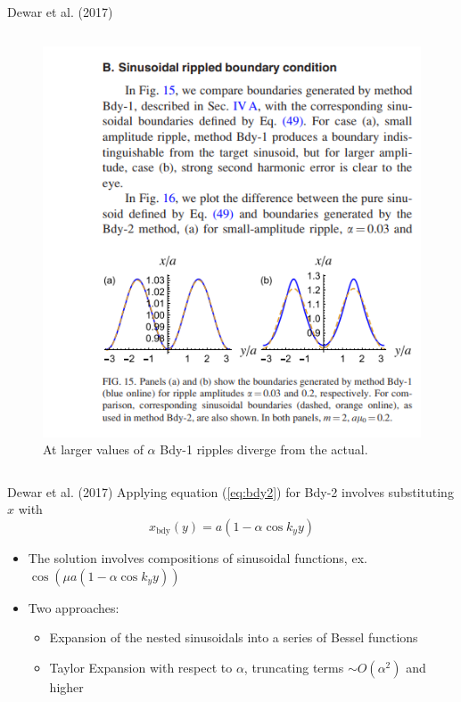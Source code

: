 \documentclass[compress]{beamer}
\begin{document}
\begin{frame}{Dewar et al. (2017) \cite{dewar2017}}
\begin{columns}
\begin{column}{0.5\textwidth}
\begin{figure}[htpb]
                \includegraphics[scale=0.25]{media/dewar-bdy1-error.png}
                \caption{At larger values of $\alpha$ Bdy-1 ripples diverge from the actual.}
            \end{figure}
        \end{column}
    \end{columns}

\end{frame}

\begin{frame}{Dewar et al. (2017) \cite{dewar2017}}
    Applying equation (\ref{eq:bdy2}) for Bdy-2 involves substituting $x$ with
    \[
        x_{\text{bdy}}\left( y \right) =a\left( 1-\alpha\cos{k_y y} \right) 
    \]
    \begin{itemize}
        \item The solution involves compositions of sinusoidal functions, ex. $\cos(\mu a(1-\alpha\cos{k_y y}))$
        \item Two approaches:
            \begin{itemize}
                \item Expansion of the nested sinusoidals into a series of Bessel functions %
                \item Taylor Expansion with respect to $\alpha$, truncating terms $\sim O(\alpha^2)$ and higher
            \end{itemize}
    \end{itemize}
\end{frame}
\end{document}
